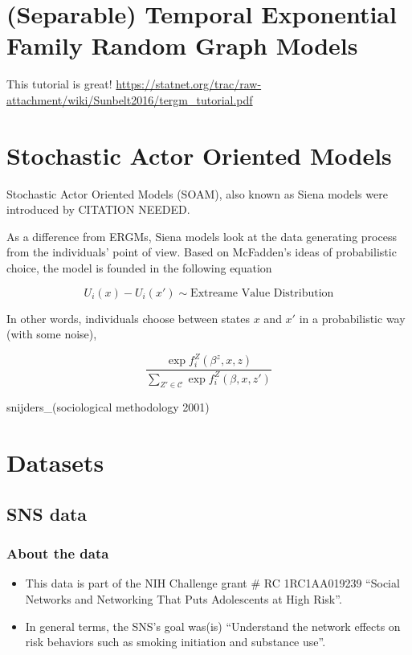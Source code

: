 \documentclass[]{book}
\theoremstyle{definition}
\theoremstyle{definition}
\theoremstyle{definition}
\theoremstyle{remark}
\begin{document}
\chapter{(Separable) Temporal Exponential Family Random Graph
Models}\label{separable-temporal-exponential-family-random-graph-models}

This tutorial is great!
\url{https://statnet.org/trac/raw-attachment/wiki/Sunbelt2016/tergm_tutorial.pdf}

\chapter{Stochastic Actor Oriented
Models}\label{stochastic-actor-oriented-models}

Stochastic Actor Oriented Models (SOAM), also known as Siena models were
introduced by CITATION NEEDED.

As a difference from ERGMs, Siena models look at the data generating
process from the individuals' point of view. Based on McFadden's ideas
of probabilistic choice, the model is founded in the following equation

\[
U_i(x) - U_i(x') \sim \mbox{Extreame Value Distribution}
\]

In other words, individuals choose between states \(x\) and \(x'\) in a
probabilistic way (with some noise),

\[
\frac{\exp{f_i^Z(\beta^z,x, z)}}{\sum_{Z'\in\mathcal{C}}\exp{f_i^{Z}(\beta, x, z')}}
\]

snijders\_(sociological methodology 2001)

\cleardoublepage 

\appendix


\chapter{Datasets}\label{datasets}

\hypertarget{sns-data}{\section{SNS data}\label{sns-data}}

\subsection{About the data}\label{about-the-data}

\begin{itemize}
\item
  This data is part of the NIH Challenge grant \# RC 1RC1AA019239
  ``Social Networks and Networking That Puts Adolescents at High Risk''.
\item
  In general terms, the SNS's goal was(is) ``Understand the network
  effects on risk behaviors such as smoking initiation and substance
  use''.
\end{itemize}
\end{document}
